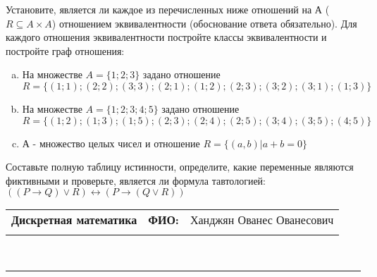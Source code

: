 \documentclass[10pt]{exam}
\newcommand{\class}{Дискретная математика}
\newcommand{\examdate}{}
\begin{document}
\begin{questions}
\question
Установите, является ли каждое из перечисленных ниже отношений на А ($R \subseteq A \times A$) отношением эквивалентности (обоснование ответа обязательно). Для каждого отношения эквивалентности постройте классы 
эквивалентности и постройте граф отношения:
\begin{enumerate} [a)]\setcounter{enumi}{0}
\item На множестве $A = \{1; 2; 3\}$ задано отношение $R = \{(1; 1); (2; 2); (3; 3); (2; 1); (1; 2); (2; 3); (3; 2); (3; 1); (1; 3)\}$
\item На множестве $A = \{1; 2; 3; 4; 5\}$ задано отношение $R = \{(1; 2); (1; 3); (1; 5); (2; 3); (2; 4); (2; 5); (3; 4); (3; 5); (4; 5)\}$
\item А - множество целых чисел и отношение $R = \{(a,b)|a + b = 0\}$
\end{enumerate}\question Составьте полную таблицу истинности, определите, какие переменные являются фиктивными и проверьте, является ли формула тавтологией:
$((P \rightarrow Q) \lor R) \leftrightarrow (P \rightarrow (Q \lor R))$

\end{questions}
\newpage
\begin{flushright}
\begin{tabular}{p{2.8in} r l}
\textbf{\class} & \textbf{ФИО:} &Ханджян Ованес Ованесович
\\

\textbf{\examdate} &&\\
\end{tabular}\\
\end{flushright}
\rule[1ex]{\textwidth}{.1pt}
\end{document}
